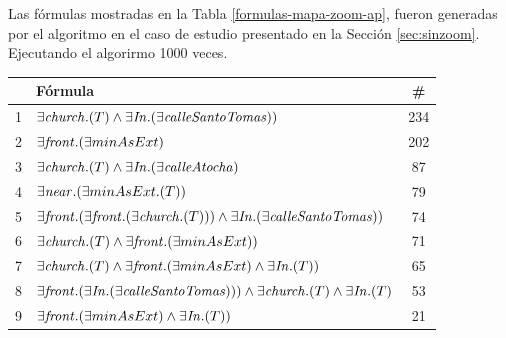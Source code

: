 





Las f\'ormulas mostradas en la Tabla \ref{formulas-mapa-zoom-ap}, fueron generadas por el algoritmo en el caso de estudio presentado en la Secci\'on \ref{sec:sinzoom}. Ejecutando el algorirmo 1000 veces.


\begin{table}[h]
\begin{center}
\begin{tabular}{|l|l|c|}
\hline
&F\'ormula			      &  \# \\ \hline \hline


1&$\exists \mathit{church}.(T) \land \exists \mathit{In} .(\exists \mathit{calleSantoTomas}))$ &234 \\ \hline

2&$\exists \mathit{front} . (\exists minAsExt)$ &202 \\ \hline

3&$\exists \mathit{church}.(T) \land \exists \mathit{In} .(\exists \mathit{calleAtocha})$ &87\\ \hline

4&$\exists \mathit{near} .(\exists minAsExt .(T))$ &79\\ \hline

5&$\exists \mathit{front}.(\exists \mathit{front}.(\exists \mathit{church}.(T))) \land \exists \mathit{In} .(\exists \mathit{calleSantoTomas}))$ &74\\ \hline

6&$\exists \mathit{church}.(T) \land \exists\mathit{front} . (\exists minAsExt))$ &71\\ \hline

7&$\exists \mathit{church}.(T) \land \exists\mathit{front} . (\exists minAsExt) \land \exists \mathit{In} .(T))$ &65\\ \hline

8&$\exists \mathit{front}.(\exists \mathit{In} .(\exists \mathit{calleSantoTomas}))) \land \exists \mathit{church}.(T) \land \exists \mathit{In} .(T)$ &53\\ \hline

9&$\exists \mathit{front} . (\exists minAsExt) \land \exists \mathit{In} .(T))$ &21\\ \hline


\end{tabular}
\end{center}
\end{table}
